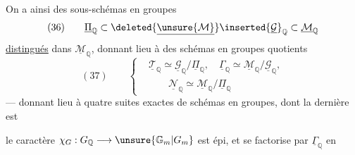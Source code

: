 On a ainsi  des sous-schémas en groupes
\[
(36)\qquad \underline{\Pi}_{\mathbb{Q}}\subset
\deleted{\underline{\unsure{\mathcal{M}}}}\inserted{\underline{\mathcal{G}}}_{\mathbb{Q}}
\subset\underline{\mathcal{M}}_{\mathbb{Q}}
\]
\uline{distingués} dans $\underline{\mathcal{M}}_{\mathbb{Q}}$, donnant lieu à des schémas en groupes quotients
\[
(37)\qquad
\left\{
\begin{aligned}
&\underline{\mathcal{T}}_{\mathbb{Q}}\simeq
\underline{\mathcal{G}}_{\mathbb{Q}}/\underline{\Pi}_{\mathbb{Q}},\quad
\underline{\Gamma}_{\mathbb{Q}}\simeq
\underline{\mathcal{M}}_{\mathbb{Q}}/\underline{\mathcal{G}}_{\mathbb{Q}},\\
&\qquad\underline{\mathcal{N}}_{\mathbb{Q}}\simeq
\underline{\mathcal{M}}_{\mathbb{Q}}/\underline{\Pi}_{\mathbb{Q}}
\end{aligned}
\right.
\]
--- donnant lieu à quatre suites exactes de schémas en groupes, dont la dernière est

 le caractère $\chi_G:G_{\mathbb{Q}}\longrightarrow \unsure{\mathbb{G}_m|G_m}$ est épi, et se factorise par $\underline{\Gamma}_{\mathbb{Q}}$ en

